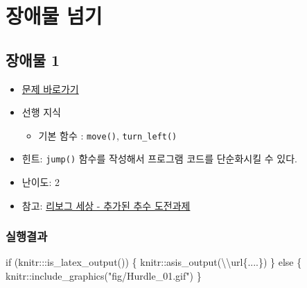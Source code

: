 \documentclass[
  b5paperpaper,
  DIV=11,
  numbers=noendperiod]{scrreprt}
\newenvironment{Shaded}{\begin{snugshade}}{\end{snugshade}}
\newcommand{\ControlFlowTok}[1]{\textcolor[rgb]{0.00,0.23,0.31}{#1}}
\newcommand{\FunctionTok}[1]{\textcolor[rgb]{0.28,0.35,0.67}{#1}}
\newcommand{\NormalTok}[1]{\textcolor[rgb]{0.00,0.23,0.31}{#1}}
\newcommand{\SpecialCharTok}[1]{\textcolor[rgb]{0.37,0.37,0.37}{#1}}
\newcommand{\StringTok}[1]{\textcolor[rgb]{0.13,0.47,0.30}{#1}}
\providecommand{\tightlist}{%
  \setlength{\itemsep}{0pt}\setlength{\parskip}{0pt}}\usepackage{longtable,booktabs,array}
\begin{document}
\hypertarget{hurdle}{%
\chapter{장애물 넘기}\label{hurdle}}

\hypertarget{hurdle-01}{%
\section{장애물 1}\label{hurdle-01}}

\begin{itemize}
\tightlist
\item
  \href{https://reeborg.ca/reeborg.html?lang=ko-en\&mode=python\&menu=worlds\%2Fmenus\%2Freeborg_intro_en.json\&name=Hurdle\%201\&url=worlds\%2Ftutorial_en\%2Fhurdle1.json}{문제
  바로가기}
\item
  선행 지식

  \begin{itemize}
  \tightlist
  \item
    기본 함수 : \texttt{move()}, \texttt{turn\_left()}
  \end{itemize}
\item
  힌트: \texttt{jump()} 함수를 작성해서 프로그램 코드를 단순화시킬 수
  있다.
\item
  난이도: 2
\item
  참고: \href{https://reeborg.ca/docs/ko/variables/harvest3.html}{리보그
  세상 - 추가된 추수 도전과제}
\end{itemize}

\hypertarget{uxc2e4uxd589uxacb0uxacfc-11}{%
\subsection{실행결과}\label{uxc2e4uxd589uxacb0uxacfc-11}}

\begin{Shaded}
\begin{Highlighting}[]
\ControlFlowTok{if}\NormalTok{ (knitr}\SpecialCharTok{:::}\FunctionTok{is\_latex\_output}\NormalTok{()) \{}
\NormalTok{  knitr}\SpecialCharTok{::}\FunctionTok{asis\_output}\NormalTok{(}\StringTok{\textquotesingle{}}\SpecialCharTok{\textbackslash{}\textbackslash{}}\StringTok{url\{....\}\textquotesingle{}}\NormalTok{)}
\NormalTok{\} }\ControlFlowTok{else}\NormalTok{ \{}
\NormalTok{  knitr}\SpecialCharTok{::}\FunctionTok{include\_graphics}\NormalTok{(}\StringTok{"fig/Hurdle\_01.gif"}\NormalTok{)}
\NormalTok{\}}
\end{Highlighting}
\end{Shaded}
\end{document}
